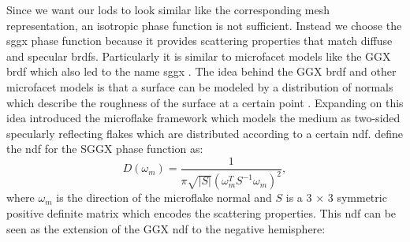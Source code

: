 Since we want our \acp{lod} to look similar like the corresponding mesh representation, an isotropic phase function is not sufficient.
Instead we choose the \acs{sggx} phase function \cite{sggx} because it provides scattering properties that match diffuse and specular \acsp{brdf}.
Particularly it is similar to microfacet models like the GGX \acs{brdf} \cite{ggx} which also led to the name \acf{sggx} \cite{sggx}.
The idea behind the GGX \ac{brdf} and other microfacet models is that a surface can be modeled by a distribution of normals which describe the roughness of the surface at a certain point \cite{ggx}.
Expanding on this idea \citeauthor{microflake} \cite{microflake} introduced the microflake framework which models the medium as two-sided specularly reflecting flakes which are distributed according to a certain \ac{ndf}.
\citeauthor{sggx} \cite{sggx} define the \ac{ndf} for the SGGX phase function as:
\begin{equation}
    D(\omega_m)=\frac{1}{\pi \sqrt{|S|}(\omega_m^T S^{-1} \omega_m)^2},
\end{equation}
where $\omega_m$ is the direction of the microflake normal and $S$ is a 3 $\times$ 3 symmetric positive definite matrix which encodes the scattering properties.
This \ac{ndf} can be seen as the extension of the GGX \acs{ndf} to the negative hemisphere:
